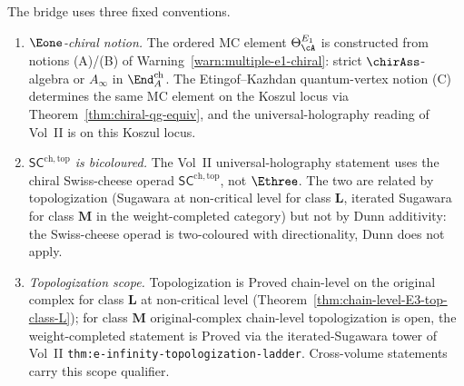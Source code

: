 \begin{remark}
\label{rem:e1-bridge-conventions}
The bridge uses three fixed conventions.

\begin{enumerate}[label=\textup{(\Alph*)}]
\item \emph{$\Eone$-chiral notion.}
 The ordered MC element $\Theta_\cA^{E_1}$ is constructed from
 notions \textup{(A)}/\textup{(B)} of
 Warning~\ref{warn:multiple-e1-chiral}: strict
 $\chirAss$-algebra or $A_\infty$ in $\End^{\mathrm{ch}}_A$.
 The Etingof--Kazhdan quantum-vertex notion \textup{(C)}
 determines the same MC element on the Koszul locus via
 Theorem~\ref{thm:chiral-qg-equiv}, and the universal-holography
 reading of Vol~II is on this Koszul locus.
\item \emph{$\mathsf{SC}^{\mathrm{ch,top}}$ is bicoloured.}
 The Vol~II universal-holography statement uses the chiral
 Swiss-cheese operad $\mathsf{SC}^{\mathrm{ch,top}}$, not
 $\Ethree$. The two are related by topologization
 (Sugawara at non-critical level for class $\mathbf{L}$,
 iterated Sugawara for class $\mathbf{M}$ in the
 weight-completed category) but not by Dunn additivity:
 the Swiss-cheese operad is two-coloured with directionality,
 Dunn does not apply.
\item \emph{Topologization scope.}
 Topologization is \textup{Proved chain-level on the
 original complex} for class $\mathbf{L}$ at non-critical
 level (Theorem~\ref{thm:chain-level-E3-top-class-L}); for
 class $\mathbf{M}$ original-complex chain-level
 topologization is open, the weight-completed statement is
 \textup{Proved} via the iterated-Sugawara tower of
 Vol~II \texttt{thm:e-infinity-topologization-ladder}.
 Cross-volume statements carry this scope qualifier.
\end{enumerate}
\end{remark}

